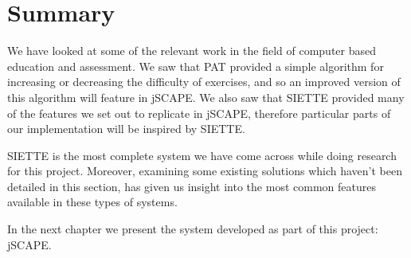 \section{Summary}
We have looked at some of the relevant work in the field of computer based education and assessment. We saw that PAT provided a simple algorithm for increasing or decreasing the difficulty of exercises, and so an improved version of this algorithm will feature in jSCAPE. We also saw that SIETTE provided many of the features we set out to replicate in jSCAPE, therefore particular parts of our implementation will be inspired by SIETTE.\newline

SIETTE is the most complete system we have come across while doing research for this project. Moreover, examining some existing solutions which haven't been detailed in this section, has given us insight into the most common features available in these types of systems. \newline

In the next chapter we present the system developed as part of this project: jSCAPE. 